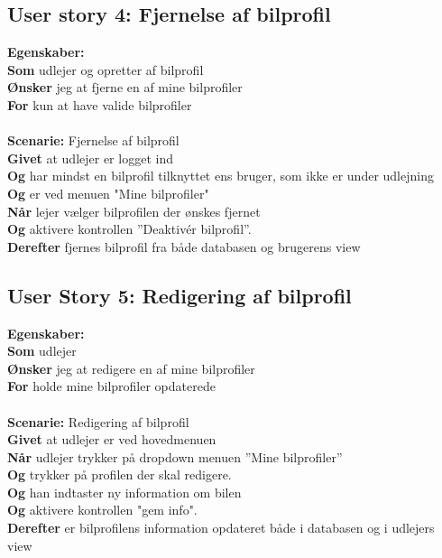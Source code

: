 \documentclass[Kravspecifikation/Kravspec_Main.tex]{subfiles}
\begin{document}
\subsection{User story 4: Fjernelse af bilprofil}
\textbf{Egenskaber:} \\
\textbf{Som} udlejer og opretter af bilprofil \\
\textbf{Ønsker} jeg at fjerne en af mine bilprofiler \\
\textbf{For} kun at have valide bilprofiler
\\\\ 
\textbf{Scenarie:} Fjernelse af bilprofil\\
\textbf{Givet} at udlejer er logget ind\\ 
\textbf{Og} har mindst en bilprofil tilknyttet ens bruger, som ikke er under udlejning \\
\textbf{Og} er ved menuen "Mine bilprofiler"\\
\textbf{Når} lejer vælger bilprofilen der ønskes fjernet \\
\textbf{Og} aktivere kontrollen ''Deaktivér bilprofil''. \\
\textbf{Derefter} fjernes bilprofil fra både databasen og brugerens view

\subsection{User Story 5: Redigering af bilprofil}
\textbf{Egenskaber:} \\
\textbf{Som} udlejer \\
\textbf{Ønsker} jeg at redigere en af mine bilprofiler\\
\textbf{For} holde mine bilprofiler opdaterede
\\\\
\textbf{Scenarie:} Redigering af bilprofil \\
\textbf{Givet} at udlejer er ved hovedmenuen  \\
\textbf{Når} udlejer trykker på dropdown menuen ''Mine bilprofiler''\\
\textbf{Og} trykker på profilen der skal redigere.\\
\textbf{Og} han indtaster ny information om bilen\\
\textbf{Og} aktivere kontrollen "gem info".\\
\textbf{Derefter} er bilprofilens information opdateret både i databasen og i udlejers view
\end{document}
